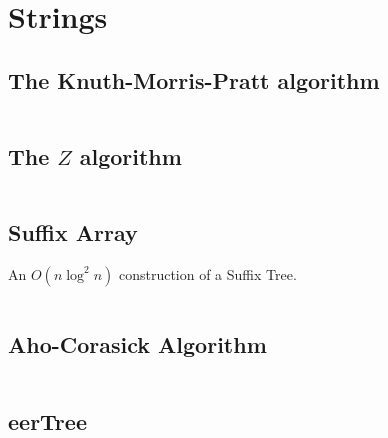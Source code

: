 \documentclass[9pt,a4paper,twocolumn,landscape,oneside]{amsart}
\newcommand{\code}[1]{\inputminted{cpp}{_code/#1}}
\newif\ifverbose
\begin{document}
\section{Strings}

    \subsection{The Knuth-Morris-Pratt algorithm}
        \ifverbose
        An implementation of the Knuth-Morris-Pratt algorithm. Runs in $O(n+m)$
        time, where $n$ and $m$ are the lengths of the string and the pattern.
        \fi
        \code{strings/kmp.cpp}

    \subsection{The $Z$ algorithm}
        \ifverbose
        Given a string $S$, $Z_i(S)$ is the longest substring of $S$ starting
        at $i$ that is also a prefix of $S$. The $Z$ algorithm computes these
        $Z$ values in $O(n)$ time, where $n = |S|$. $Z$ values can, for
        example, be used to find all occurrences of a pattern $P$ in a string
        $T$ in linear time. This is accomplished by computing $Z$ values of $S
        = T P$, and looking for all $i$ such that $Z_i \geq |T|$.
        \fi
        \code{strings/z_algorithm.cpp}

    \ifverbose
    \subsection{Trie}
        A Trie class.
        \code{strings/trie.cpp}
    \fi

    \subsection{Suffix Array}
        An $O(n \log^2 n)$ construction of a Suffix Tree.
        \code{strings/suffix_array.cpp}

    \subsection{Aho-Corasick Algorithm}
        \ifverbose
        An implementation of the Aho-Corasick algorithm. Constructs a state
        machine from a set of keywords which can be used to search a string for
        any of the keywords.
        \fi
        \code{strings/aho_corasick.cpp}

    \subsection{eerTree}
        \ifverbose
        Constructs an eerTree in $O(n)$, one character at a time.
        \fi
        \code{strings/eertree.cpp}
\end{document}

